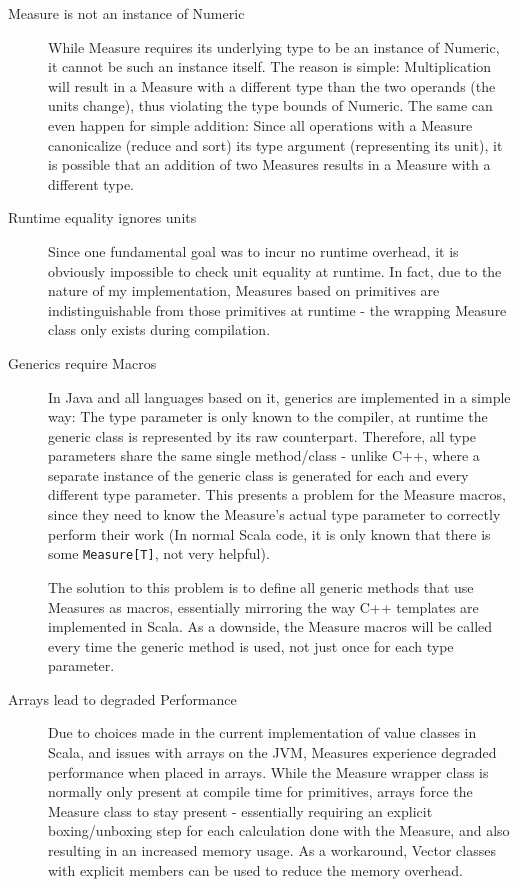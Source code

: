 \documentclass[12pt,oneside,a4paper]{scrbook}
\begin{document}
\begin{description}
  \item[Measure is not an instance of Numeric] While Measure requires its underlying type to be an instance of Numeric, it cannot be such an instance itself. The reason is simple: Multiplication will result in a Measure with a different type than the two operands (the units change), thus violating the type bounds of Numeric. The same can even happen for simple addition: Since all operations with a Measure canonicalize (reduce and sort) its type argument (representing its unit), it is possible that an addition of two Measures results in a Measure with a different type.

  \item[Runtime equality ignores units] Since one fundamental goal was to incur no runtime overhead, it is obviously impossible to check unit equality at runtime. In fact, due to the nature of my implementation, Measures based on primitives are indistinguishable from those primitives at runtime - the wrapping Measure class only exists during compilation.

  \item[Generics require Macros] In Java and all languages based on it, generics are implemented in a simple way: The type parameter is only known to the compiler, at runtime the generic class is represented by its raw counterpart. Therefore, all type parameters share the same single method/class - unlike C++, where a separate instance of the generic class is generated for each and every different type parameter. This presents a problem for the Measure macros, since they need to know the Measure's actual type parameter to correctly perform their work (In normal Scala code, it is only known that there is some \verb|Measure[T]|, not very helpful).

  The solution to this problem is to define all generic methods that use Measures as macros, essentially mirroring the way C++ templates are implemented in Scala. As a downside, the Measure macros will be called every time the generic method is used, not just once for each type parameter.

  \item[Arrays lead to degraded Performance] Due to choices made in the current implementation of value classes in Scala, and issues with arrays on the JVM, Measures experience degraded performance when placed in arrays. While the Measure wrapper class is normally only present at compile time for primitives, arrays force the Measure class to stay present - essentially requiring an explicit boxing/unboxing step for each calculation done with the Measure, and also resulting in an increased memory usage. As a workaround, Vector classes with explicit members can be used to reduce the memory overhead.


\end{description}
\end{document}
